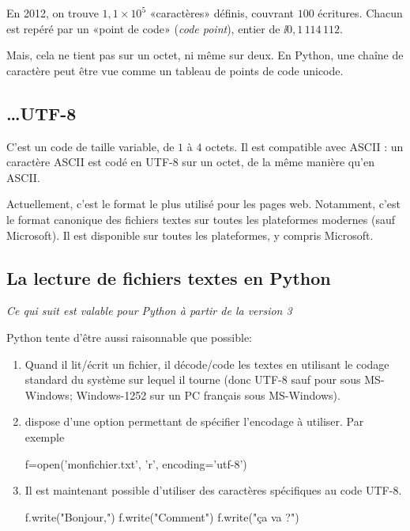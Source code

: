 En 2012, on trouve $1,1\times 10^{5}$ «caractères» définis, couvrant $100$ écritures. Chacun est repéré par un «point de code» (\textit{code point}),
entier de $\ii{0, 1\,114\,112}$.

Mais, cela ne tient pas sur un octet, ni même sur deux. En Python, une  chaîne de caractère peut être vue  comme un tableau de points de code unicode.

\subsection{\ldots{}UTF-8}

C'est un code de taille variable, de $1$ à $4$ octets. Il est compatible avec ASCII : un caractère ASCII est codé en UTF-8 sur un octet, de la même manière qu'en ASCII.

Actuellement, c'est le format le plus utilisé pour les pages web. Notamment, c'est le format canonique des fichiers textes sur toutes les  plateformes modernes (sauf Microsoft).
Il est disponible sur toutes les plateformes, y compris Microsoft.


\subsection{La lecture de fichiers textes en Python}

\emph{Ce qui suit est valable pour Python à partir de la version 3}

Python tente d'être aussi raisonnable que possible:
\begin{enumerate}
\item Quand il lit/écrit un fichier, il décode/code les textes en
  utilisant le codage standard du système sur lequel il tourne (donc
  UTF-8 sauf pour sous MS-Windows; Windows-1252 sur un PC français
  sous MS-Windows).
\item {} dispose d'une option permettant de spécifier
  l'encodage à utiliser. Par exemple
\begin{pyverbatim}
f=open('monfichier.txt', 'r', encoding='utf-8')
\end{pyverbatim}
\item Il est maintenant possible d'utiliser des caractères spécifiques au code UTF-8.
\begin{pyverbatim}
f.write("Bonjour,\n")
f.write("Comment")
f.write("ça va ?")
\end{pyverbatim}
\end{enumerate}

